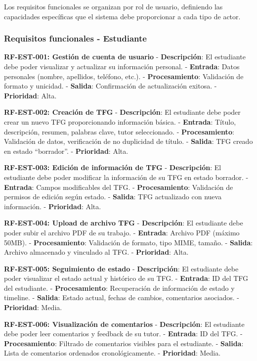 \documentclass[12pt,a4paper,oneside]{report}
\begin{document}
Los requisitos funcionales se organizan por rol de usuario, definiendo
las capacidades específicas que el sistema debe proporcionar a cada tipo
de actor.

\subsubsection{Requisitos funcionales -
Estudiante}\label{requisitos-funcionales---estudiante}

\textbf{RF-EST-001: Gestión de cuenta de usuario} -
\textbf{Descripción}: El estudiante debe poder visualizar y actualizar
su información personal. - \textbf{Entrada}: Datos personales (nombre,
apellidos, teléfono, etc.). - \textbf{Procesamiento}: Validación de
formato y unicidad. - \textbf{Salida}: Confirmación de actualización
exitosa. - \textbf{Prioridad}: Alta.

\textbf{RF-EST-002: Creación de TFG} - \textbf{Descripción}: El
estudiante debe poder crear un nuevo TFG proporcionando información
básica. - \textbf{Entrada}: Título, descripción, resumen, palabras
clave, tutor seleccionado. - \textbf{Procesamiento}: Validación de
datos, verificación de no duplicidad de título. - \textbf{Salida}: TFG
creado en estado ``borrador''. - \textbf{Prioridad}: Alta.

\textbf{RF-EST-003: Edición de información de TFG} -
\textbf{Descripción}: El estudiante debe poder modificar la información
de su TFG en estado borrador. - \textbf{Entrada}: Campos modificables
del TFG. - \textbf{Procesamiento}: Validación de permisos de edición
según estado. - \textbf{Salida}: TFG actualizado con nueva información.
- \textbf{Prioridad}: Alta.

\textbf{RF-EST-004: Upload de archivo TFG} - \textbf{Descripción}: El
estudiante debe poder subir el archivo PDF de su trabajo. -
\textbf{Entrada}: Archivo PDF (máximo 50MB). - \textbf{Procesamiento}:
Validación de formato, tipo MIME, tamaño. - \textbf{Salida}: Archivo
almacenado y vinculado al TFG. - \textbf{Prioridad}: Alta.

\textbf{RF-EST-005: Seguimiento de estado} - \textbf{Descripción}: El
estudiante debe poder visualizar el estado actual y histórico de su TFG.
- \textbf{Entrada}: ID del TFG del estudiante. - \textbf{Procesamiento}:
Recuperación de información de estado y timeline. - \textbf{Salida}:
Estado actual, fechas de cambios, comentarios asociados. -
\textbf{Prioridad}: Media.

\textbf{RF-EST-006: Visualización de comentarios} -
\textbf{Descripción}: El estudiante debe poder leer comentarios y
feedback de su tutor. - \textbf{Entrada}: ID del TFG. -
\textbf{Procesamiento}: Filtrado de comentarios visibles para el
estudiante. - \textbf{Salida}: Lista de comentarios ordenados
cronológicamente. - \textbf{Prioridad}: Media.
\end{document}

